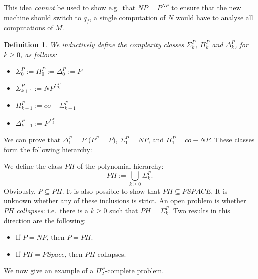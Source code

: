 \documentclass{report}
\newcommand{\NP}{\text{$\mathit{NP}$}}
\newcommand{\Po}{\text{$\mathit{P}$}}
\newtheorem{definition}{Definition}[chapter]
\begin{document}
This idea \emph{cannot} be used to show e.g.\ that $\NP = \Po^{\NP}$ to ensure that the new machine should switch to $q_f$, a single computation of $N$ would have to analyse all computations of $M$. 

\begin{definition} We inductively define the complexity classes $\Sigma_k^\Po$, $\Pi_k^\Po$ and $\Delta_k^\Po$, for $k \geq 0$, as follows:
\begin{itemize}
 \item $\Sigma_0^\Po := \Pi_0^\Po := \Delta_0^\Po := P$
 \item $\Sigma_{k+1}^\Po := \NP^{\Sigma_k^\Po}$ 
 \item $\Pi_{k+1}^\Po := co-\Sigma_{k+1}^\Po$
 \item $\Delta_{k+1}^\Po := \Po^{\Sigma_k^\Po}$
\end{itemize}
\end{definition}

We can prove that $\Delta_1^\Po = \Po$ ($\Po^\Po = \Po$), $\Sigma_1^\Po = \NP$, and $\Pi_1^\Po = co-\NP$. These classes form the following hierarchy:
\begin{figure}[!ht]
\newcommand{\hdiff}{4em}
\newcommand{\vdiff}{2em}
\centering
{}
\end{figure}

We define the class $PH$ of the polynomial hierarchy: 
\[PH := \bigcup_{k \geq 0} \Sigma_k^\Po.\]
Obviously, $\Po \subseteq PH$. It is also possible to show that $PH \subseteq PSPACE$. It is unknown whether any of these inclusions is strict. An open problem is whether $PH$ \emph{collapses}: i.e.\, there is a $k \geq 0$ such that $PH = \Sigma_k^\Po$. Two results in this direction are the following:
\begin{itemize}
 \item If $\Po = \NP$, then $\Po = PH$.
 \item If $PH = PSpace$, then $PH$ collapses. 
\end{itemize}
We now give an example of a $\Pi_2^\Po$-complete problem. 
\end{document}
